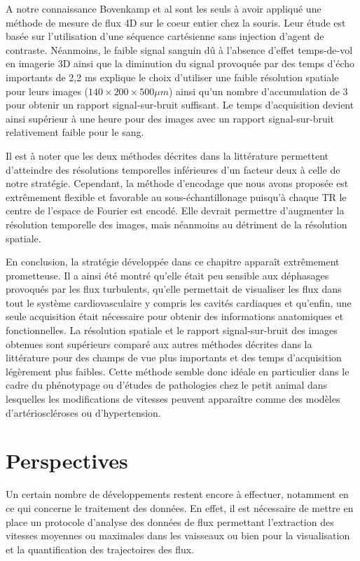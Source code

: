 A notre connaissance Bovenkamp et al \cite{bovenkamp2014velocity} sont les seuls à avoir appliqué une méthode de mesure de flux 4D sur le coeur entier chez la souris. Leur étude est basée sur l'utilisation d'une séquence cartésienne sans injection d'agent de contraste.
Néanmoins, le faible signal sanguin dû à l'absence d'effet temps-de-vol en imagerie 3D ainsi que la diminution du signal  provoquée par des temps d'écho importants de 2,2 ms explique le choix d'utiliser une faible résolution spatiale pour leurs images ($140 \times 200 \times 500 \mu m$) ainsi qu'un nombre d'accumulation de 3 pour obtenir un rapport signal-sur-bruit suffisant. Le temps d’acquisition devient ainsi supérieur à une heure pour des images avec un rapport signal-sur-bruit relativement faible pour le sang.

Il est à noter que les deux méthodes décrites dans la littérature permettent d'atteindre des résolutions temporelles inférieures d'un facteur deux à celle de notre stratégie. Cependant, la méthode d’encodage que nous avons proposée est extrêmement flexible et favorable au sous-échantillonage puisqu’à chaque TR le centre de l’espace de Fourier est encodé. Elle devrait permettre d’augmenter la résolution temporelle des images, mais néanmoins au détriment de la résolution spatiale.

En conclusion, la stratégie développée dans ce chapitre apparaît extrêmement prometteuse. Il a ainsi été montré qu’elle était peu sensible aux déphasages provoqués par les flux turbulents, qu’elle permettait de visualiser les flux dans tout le système cardiovasculaire y compris les cavités cardiaques et qu’enfin, une seule acquisition était nécessaire pour obtenir des informations anatomiques et fonctionnelles.
La résolution spatiale et le rapport signal-sur-bruit des images obtenues sont supérieurs comparé aux autres méthodes décrites dans la littérature pour des champs de vue plus importants et des temps d’acquisition légèrement plus faibles. Cette méthode semble donc idéale en particulier dans le cadre du phénotypage ou d’études de pathologies chez le petit animal dans lesquelles les modifications de vitesses peuvent apparaître comme des modèles d’artérioscléroses ou d’hypertension.

\section{Perspectives}

Un certain nombre de développements restent encore à effectuer, notamment en ce qui concerne le traitement des données. En effet, il est nécessaire de mettre en place un protocole d’analyse des données de flux permettant l’extraction des vitesses moyennes ou maximales dans les vaisseaux ou bien pour la visualisation et la quantification des trajectoires des flux.

